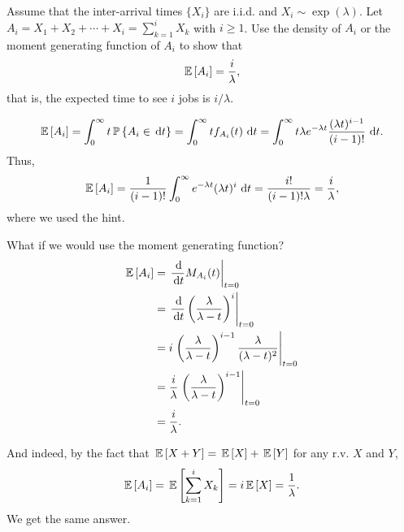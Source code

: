   \begin{question}
    Assume that the inter-arrival times $\{X_i\}$ are i.i.d. and
    $X_i\sim\exp(\lambda)$. Let
    $A_i=X_1+X_2+\cdots+X_i=\sum_{k=1}^i X_k$ with $i\geq 1$. Use the
    density of $A_i$ or the moment generating function of $A_i$ to
    show that
 \begin{equation*}
\,\mathbb{E}\left[A_i\right] = \frac i\lambda,
 \end{equation*}
 that is, the expected time to see $i$ jobs is $i/\lambda$.
  \begin{solution}
  \begin{equation*}
\,\mathbb{E}\left[A_i\right] = \int_0^\infty t \,\mathbb{P}\left\{A_i \in \,\text{d}t\right\} = \int_0^\infty t f_{A_i} (t) \, \,\text{d}t  = 
\int_0^\infty t  \lambda e^{-\lambda t} \frac{(\lambda t)^{i-1}}{(i-1)!}\, \,\text{d}t.
  \end{equation*}
Thus, 
  \begin{equation*}
\,\mathbb{E}\left[A_i\right] = \frac{1}{(i-1)!} \int_0^\infty   e^{-\lambda t} (\lambda t)^i\,\,\text{d}t = \frac{i!}{(i-1)!\lambda}=\frac{i}\lambda,
  \end{equation*}
  where we used the hint.

What if we would use the moment generating function? 
\begin{equation*}
  \begin{split}
    \E{A_i} 
&= \left.\frac{\d}{\d t} M_{A_i}(t)\right|_{t=0} \\
&= \left.\frac{\d}{\d t} \left(\frac{\lambda}{\lambda-t}\right)^i\right|_{t=0} \\
&= i \left.\left(\frac{\lambda}{\lambda-t}\right)^{i-1}\frac{\lambda}{(\lambda-t)^2}\right|_{t=0} \\
&= \frac i\lambda \left.\left(\frac{\lambda}{\lambda-t}\right)^{i-1}\right|_{t=0} \\
&= \frac i\lambda.
  \end{split}
\end{equation*}

And indeed, by the fact that $\,\mathbb{E}\left[X+Y\right]= \,\mathbb{E}\left[X\right] + \,\mathbb{E}\left[Y\right]$ for any r.v. $X$ and $Y$,
\begin{equation*}
\,\mathbb{E}\left[A_i\right] = \,\mathbb{E}\left[\sum_{k=1}^i X_k\right] = i \,\mathbb{E}\left[X\right] = \frac 1 \lambda.
\end{equation*}
We get the same answer. 
  \end{solution}
\end{question}


